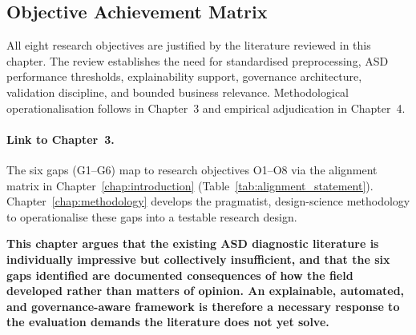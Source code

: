 \subsection{Objective Achievement Matrix}

\noindent All eight research objectives are justified by the literature reviewed in this chapter. The review establishes the need for standardised preprocessing, ASD performance thresholds, explainability support, governance architecture, validation discipline, and bounded business relevance. Methodological operationalisation follows in Chapter~3 and empirical adjudication in Chapter~4.


\paragraph{Link to Chapter~3.}
The six gaps (G1--G6) map to research objectives O1--O8 via the alignment matrix in Chapter~\ref{chap:introduction} (Table~\ref{tab:alignment_statement}). Chapter~\ref{chap:methodology} develops the pragmatist, design-science methodology to operationalise these gaps into a testable research design.

\textbf{This chapter argues that the existing ASD diagnostic literature is individually impressive but collectively insufficient, and that the six gaps identified are documented consequences of how the field developed rather than matters of opinion. An explainable, automated, and governance-aware framework is therefore a necessary response to the evaluation demands the literature does not yet solve.}

